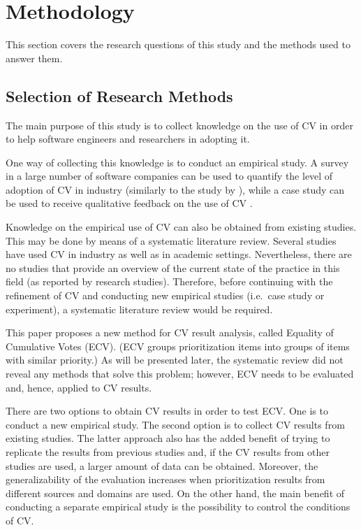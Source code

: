 \section{Methodology\label{methodology}}

This section covers the research questions of this study and the methods used to answer them.

\subsection{Selection of Research Methods}

The main purpose of this study is to collect knowledge on the use of CV in order to help software engineers and researchers in adopting it.%

One way of collecting this knowledge is to conduct an empirical study. A
survey in a large number of software companies can be used to quantify the
level of adoption of CV in industry (similarly to the study by \citep{Zahedi1986}), while a case study can be used to receive qualitative feedback on the use of CV
\citep{Runeson2008}.

Knowledge on the empirical use of CV can also be obtained from existing
studies. This may be done by means of a systematic literature review. Several
studies have used CV in industry as well as in academic settings.
Nevertheless, there are no studies that provide an overview of the current state
of the practice in this field (as reported by research studies). 
Therefore, before continuing with the refinement of CV and conducting new 
empirical studies (i.e.\ case study or experiment), a systematic literature review would 
be required.

This paper proposes a new method for CV result analysis, called Equality of Cumulative Votes (ECV).
(ECV groups prioritization items into groups of items with similar priority.)
As will be presented later, the systematic review did not reveal any methods that solve this problem; however, ECV needs to be evaluated and, hence, applied to CV results.

There are two options to obtain CV results in order to test ECV. One is to conduct a new empirical study. The second option is to collect CV results from existing studies. The latter approach also has the added benefit of trying to replicate the results from previous studies and, if the CV results from other studies are used, a larger amount of data can be obtained. Moreover, the generalizability of the evaluation increases when prioritization results from different sources and domains are used.
On the other hand, the main benefit of conducting a separate empirical study is the possibility to control the conditions of CV.

